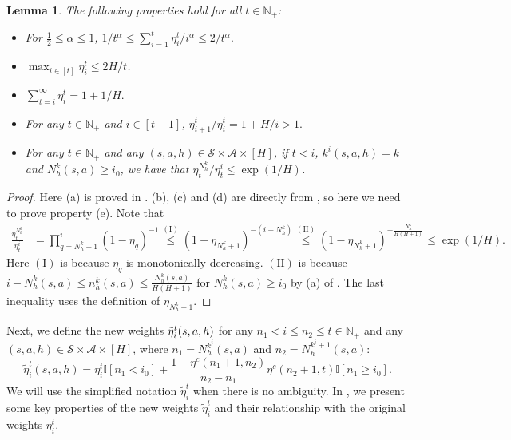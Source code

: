 \documentclass{article}
\newtheorem{lemma}{Lemma}[section]
\begin{document}
 \begin{lemma}\label{property_eta}
		The following properties hold for all $t\in\mathbb{N}_+$:
		\begin{itemize}
			\item[(a)] For $\frac{1}{2}\leq \alpha \leq 1$, $1/t^{\alpha}\leq \sum_{i=1}^t\eta_i^t/i^{\alpha}\leq 2/t^{\alpha}.$
			\item[(b)] $\max_{i\in [t]}\eta_i^t\leq 2H/t$.
			\item[(c)] $\sum_{t=i}^\infty \eta_i^t = 1+1/H.$
			\item[(d)] For any $t\in\mathbb{N}_+$ and 
			$i\in [t-1]$,
			$\eta^t_{i+1}/\eta_i^t = 1+H/i>1.$
			\item[(e)] For any $t\in\mathbb{N}_+$ and any $(s,a,h)\in \mathcal{S} \times \mathcal{A} \times [H]$, if $t < i$, $k^{i}(s,a,h) =k$ and $N_h^k(s,a)\geq i_0$, we have that
			$\eta_t^{N_h^k}/\eta_t^{i}\leq \exp(1/H)$.
		\end{itemize}
	\end{lemma}
\begin{proof}
        Here (a) is proved in \cite[Lemma 1]{li2023breaking}. (b), (c) and (d) are directly from \cite[Lemma B.2]{zheng2023federated}, so here we need to prove property (e). Note that
\begin{align*}
    \frac{\eta_{t}^{N_h^k}}{\eta_{t}^{i}} &= \prod_{q = N_h^k+1}^{i} (1-\eta_q)^{-1} \overset{(\mathrm{I})}{\leq} \left(1-\eta_{N_h^{k}+1}\right)^{-(i-N_h^k)} \overset{(\mathrm{II})}{\leq} \left(1-\eta_{N_h^{k}+1}\right)^{-\frac{N_h^{k}}{H(H+1)}} \leq \exp(1/H).
\end{align*}
Here $(\mathrm{I})$ is because $\eta_q$ is monotonically decreasing. $(\mathrm{II})$ is because $i-N_h^k(s,a) \leq n_h^{k}(s,a) \leq \frac{N_h^k(s,a)}{H(H+1)}$ for $N_h^k(s,a) \geq i_0$ by (a) of . The last inequality uses the definition of $\eta_{N_h^{k}+1}$.
    \end{proof}
Next, we define the new weights $\Tilde{\eta}^t_i(s,a,h)$ for any $n_1 < i \leq n_2 \leq t \in \mathbb{N}_+$ and any $(s,a,h)\in \mathcal{S}\times \mathcal{A}\times [H]$, where $n_1 = N_h^{k^i}(s,a)$ and $n_2 = N_h^{k^i+1}(s,a)$:
\begin{equation}
\label{deftildeeta}
    \tilde{\eta}^t_i(s,a,h) = \eta^t_i\mathbb{I}[n_1<i_0] + \frac{1-\eta^c(n_1+1,n_2)}{n_2-n_1}\eta^c(n_2+1,t)\mathbb{I}[n_1\geq i_0].
\end{equation}
We will use the simplified notation $\tilde{\eta}^t_i$ when there is no ambiguity. In , we present some key properties of the new weights $\tilde{\eta}^t_i$ and their relationship with the original weights $\eta_i^t$.
 
\end{document}
